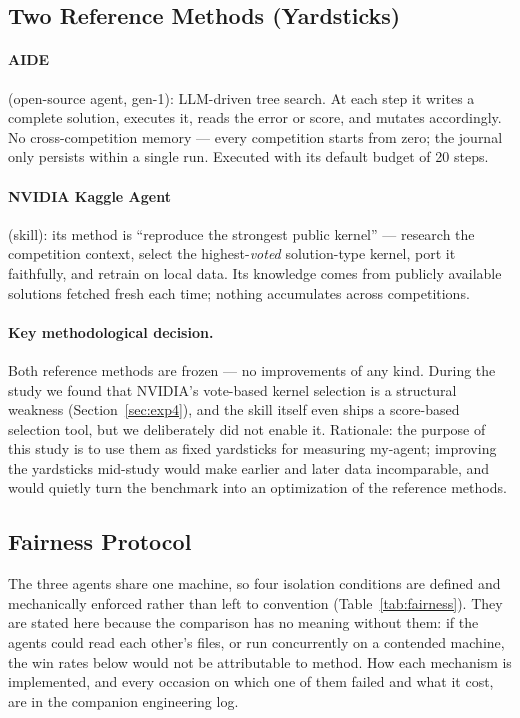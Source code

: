 \documentclass[11pt,a4paper]{article}
\begin{document}
\subsection{Two Reference Methods (Yardsticks)}

\paragraph{AIDE} (open-source agent, gen-1): LLM-driven tree search. At each step it writes a complete solution, executes it, reads the error or score, and mutates accordingly. No cross-competition memory --- every competition starts from zero; the journal only persists within a single run. Executed with its default budget of 20 steps.

\paragraph{NVIDIA Kaggle Agent} (skill): its method is ``reproduce the strongest public kernel'' --- research the competition context, select the highest-\emph{voted} solution-type kernel, port it faithfully, and retrain on local data. Its knowledge comes from publicly available solutions fetched fresh each time; nothing accumulates across competitions.

\paragraph{Key methodological decision.} Both reference methods are frozen --- no improvements of any kind. During the study we found that NVIDIA's vote-based kernel selection is a structural weakness (Section~\ref{sec:exp4}), and the skill itself even ships a score-based selection tool, but we deliberately did not enable it. Rationale: the purpose of this study is to use them as fixed yardsticks for measuring my-agent; improving the yardsticks mid-study would make earlier and later data incomparable, and would quietly turn the benchmark into an optimization of the reference methods.

\subsection{Fairness Protocol}
\label{sec:fairness}

The three agents share one machine, so four isolation conditions are defined and mechanically
enforced rather than left to convention (Table~\ref{tab:fairness}). They are stated here
because the comparison has no meaning without them: if the agents could read each other's
files, or run concurrently on a contended machine, the win rates below would not be
attributable to method. How each mechanism is implemented, and every occasion on which one of
them failed and what it cost, are in the companion engineering log.
\end{document}
